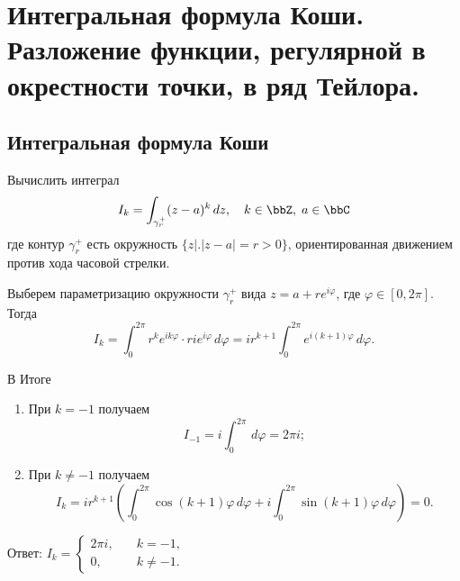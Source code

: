 \chapter{Интегральная формула Коши. Разложение функции, регулярной в окрестности точки, в ряд Тейлора.}
\section{Интегральная формула Коши}


\begin{exmpl}
\label{exmpl1}
Вычислить интеграл 
$$
I_k = \int_{\gamma_r^+} (z-a)^k\,dz, \quad k \in \bbZ, \; a\in \bbC
$$
где контур $\gamma_r^+$ есть окружность $\{ z \bigl|\bigr. |z - a| = r>0 \}$, ориентированная движением против хода часовой стрелки.
\end{exmpl}
\begin{solution}
Выберем параметризацию окружности $\gamma_r^+$ вида $z = a + r e^{i \varphi}$, где $\varphi \in [0, 2\pi]$. Тогда
$$
I_k = \int_{0}^{2 \pi} r^k e^{i k \varphi} \cdot r i e^{i \varphi} \,d\varphi = i r^{k+1} \int_{0}^{2 \pi} e^{i (k + 1) \varphi}\,d\varphi.
$$

В Итоге
\begin{enumerate}
\item
При $k = -1$ получаем $$I_{-1} = i \int_{0}^{2\pi}\,d\varphi = 2 \pi i;$$
\item
При $k \ne -1$ получаем
$$
I_k = i r^{k + 1} \left( \int_{0}^{2 \pi} \cos(k + 1) \varphi \,d \varphi + i \int_{0}^{2 \pi} \sin(k + 1) \varphi \,d\varphi \right) = 0.
$$
\end{enumerate}
Ответ: $I_k=\begin{cases}2\pi i, \quad &k=-1,\\0, \quad &k\ne -1. 
\end{cases}$\qedhere
\end{solution}

